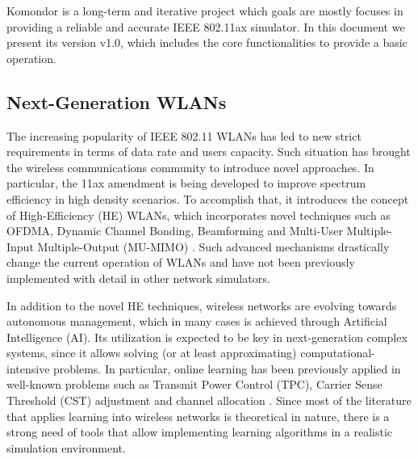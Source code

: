 \documentclass[a4paper]{article}
\begin{document}
	Komondor is a long-term and iterative project which goals are mostly focuses in providing a reliable and accurate IEEE 802.11ax simulator. In this document we present its version v1.0, which includes the core functionalities to provide a basic operation.
	
	
	\subsection{Next-Generation WLANs}
	\label{section:ng_wlans}
	The increasing popularity of IEEE 802.11 WLANs has led to new strict requirements in terms of data rate and users capacity. Such situation has brought the wireless communications community to introduce novel approaches. In particular, the 11ax amendment is being developed to improve spectrum efficiency in high density scenarios. To accomplish that, it introduces the concept of High-Efficiency (HE) WLANs, which incorporates novel techniques such as OFDMA, Dynamic Channel Bonding, Beamforming and Multi-User Multiple-Input Multiple-Output (MU-MIMO) \cite{bellalta2016ieee}. Such advanced mechanisms drastically change the current operation of WLANs and have not been previously implemented with detail in other network simulators. 
	
	In addition to the novel HE techniques, wireless networks are evolving towards autonomous management, which in many cases is achieved through Artificial Intelligence (AI). Its utilization is expected to be key in next-generation complex systems, since it allows solving (or at least approximating) computational-intensive problems. In particular, online learning has been previously applied in well-known problems such as Transmit Power Control (TPC), Carrier Sense Threshold (CST) adjustment and channel allocation \cite{wilhelmi2017implications, wilhelmi2017collaborative, maghsudi2015joint, maghsudi2015channel}. Since most of the literature that applies learning into wireless networks is theoretical in nature, there is a strong need of tools that allow implementing learning algorithms in a realistic simulation environment.	
	
\end{document}

